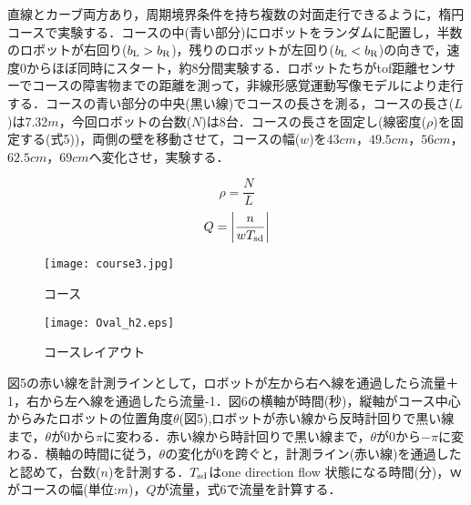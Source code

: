 直線とカーブ両方あり，周期境界条件を持ち複数の対面走行できるように，楕円コースで実験する．コースの中(青い部分)にロボットをランダムに配置し，半数のロボットが右回り($b_{\rm L}>b_{\rm R}$)，残りのロボットが左回り($b_{\rm L}<b_{\rm R}$)の向きで，速度0からほぼ同時にスタート，約8分間実験する．ロボットたちがtof距離センサーでコースの障害物までの距離を測って，非線形感覚運動写像モデルにより走行する．コースの青い部分の中央(黒い線)でコースの長さを測る，コースの長さ($L$)は7.32$m$，今回ロボットの台数($N$)は8台．コースの長さを固定し(線密度($\rho$)を固定する(式5))，両側の壁を移動させて，コースの幅($w$)を$43cm$，$49.5cm$，$56cm$，$62.5cm$，$69cm$へ変化させ，実験する．

\begin{equation}
\rho = \frac{N}{L}
\end{equation}
\begin{equation}
Q = \left| \frac{n}{wT_{\rm sd}} \right|
\end{equation}

\begin{figure}[h]
    \begin{minipage}{0.48\linewidth}
        \centering
        \texttt{[image: course3.jpg]}
        \caption{コース}
    \end{minipage}
    \begin{minipage}{0.48\linewidth}
        \centering
        \texttt{[image: Oval\_h2.eps]}
        \caption{コースレイアウト}
    \end{minipage}
\end{figure}



図5の赤い線を計測ラインとして，ロボットが左から右へ線を通過したら流量＋1，右から左へ線を通過したら流量-1．図6の横軸が時間(秒)，縦軸がコース中心からみたロボットの位置角度$\theta$(図5),ロボットが赤い線から反時計回りで黒い線まで，$\theta$が0から$\pi$に変わる．赤い線から時計回りで黒い線まで，$\theta$が0から$-\pi$に変わる．横軸の時間に従う，$\theta$の変化が$0$を跨ぐと，計測ライン(赤い線)を通過したと認めて，台数($n$)を計測する．$T_{\rm sd}$はone direction flow 状態になる時間(分)，$ｗ$がコースの幅(単位:$m$)，$Q$が流量，式6で流量を計算する．

